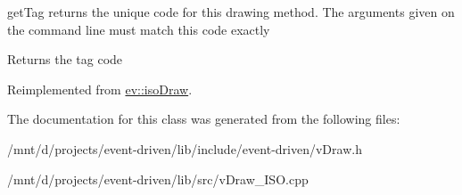 get\+Tag returns the unique code for this drawing method. The arguments given on the command line must match this code exactly 

\begin{DoxyReturn}{Returns}
the tag code 
\end{DoxyReturn}


Reimplemented from \hyperlink{classev_1_1isoDraw_abd32cc393e5489ee97b5a8b94e6dd88d}{ev\+::iso\+Draw}.



The documentation for this class was generated from the following files\+:\begin{DoxyCompactItemize}
\item 
/mnt/d/projects/event-\/driven/lib/include/event-\/driven/v\+Draw.\+h\item 
/mnt/d/projects/event-\/driven/lib/src/v\+Draw\+\_\+\+I\+S\+O.\+cpp\end{DoxyCompactItemize}
